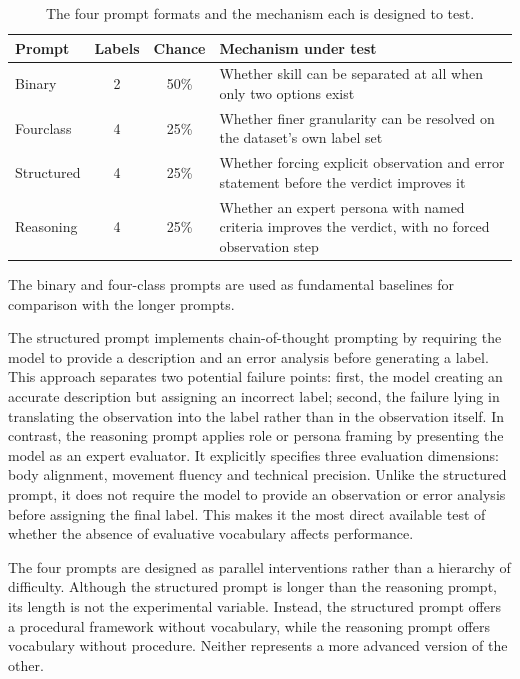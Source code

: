 \documentclass[logo,msc]{infthesis}
\begin{document}
\begin{table}[H]
\centering
\caption{The four prompt formats and the mechanism each is designed to
test.}
\label{tab:prompts}
\small
\begin{tabular}{@{}l c c p{6.6cm}@{}}
\toprule
\textbf{Prompt} & \textbf{Labels} & \textbf{Chance}
  & \textbf{Mechanism under test} \\
\midrule
Binary & 2 & 50\% & Whether skill can be separated at all when only two
  options exist \\
Fourclass & 4 & 25\% & Whether finer granularity can be resolved on the
  dataset's own label set \\
Structured & 4 & 25\% & Whether forcing explicit observation and error
  statement before the verdict improves it \\
Reasoning & 4 & 25\% & Whether an expert persona with named criteria
  improves the verdict, with no forced observation step \\
\bottomrule
\end{tabular}
\end{table}

The binary and four-class prompts are used as fundamental baselines for
comparison with the longer prompts.

The structured prompt implements chain-of-thought prompting
\citep{wei2022,kojima2022} by requiring the model to provide a description
and an error analysis before generating a label. This approach separates
two potential failure points: first, the model creating an accurate
description but assigning an incorrect label; second, the failure lying in
translating the observation into the label rather than in the observation
itself. In contrast, the reasoning prompt applies role or persona framing
\citep{kong2024} by presenting the model as an expert evaluator. It
explicitly specifies three evaluation dimensions: body alignment, movement
fluency and technical precision. Unlike the structured prompt, it does not
require the model to provide an observation or error analysis before
assigning the final label. This makes it the most direct available test of
whether the absence of evaluative vocabulary affects performance.

The four prompts are designed as parallel interventions rather than a
hierarchy of difficulty. Although the structured prompt is longer than the
reasoning prompt, its length is not the experimental variable. Instead, the
structured prompt offers a procedural framework without vocabulary, while
the reasoning prompt offers vocabulary without procedure. Neither
represents a more advanced version of the other.
\end{document}
